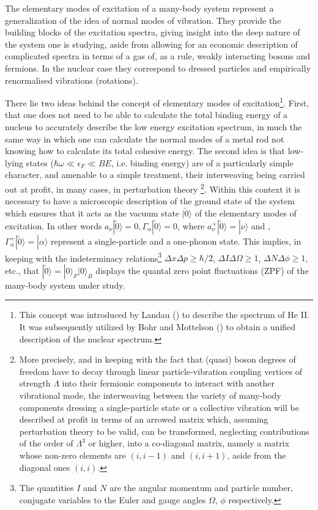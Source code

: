 The elementary modes of excitation  of a many-body system  represent a generalization of  the idea of normal modes of vibration.
They provide the building blocks of the excitation spectra, giving  insight  into the  deep nature  of the system one is studying, aside from allowing 
for an economic description  of complicated spectra in terms of a gas of, as a rule, weakly interacting bosons and fermions. In the nuclear case 
they correspond to dressed particles and empirically renormalised vibrations (rotations).

There lie two ideas behind the concept of elementary modes of excitation\footnote{This concept was introduced by Landau (\cite{Landau:41}) to describe the spectrum of He II. It was subsequently utilized by Bohr and Mottelson (\cite{Bohr:75}) to obtain a unified description of the nuclear spectrum.}. First, that one does not need to be able to calculate the total binding
energy  of a nucleus to accurately describe the low energy excitation spectrum, in much the same way in which one can calculate 
the normal modes of a metal rod not knowing how to  calculate its total cohesive energy.
The second idea is that low-lying states ($\hbar \omega \ll \epsilon_F \ll BE$, i.e. binding energy) are of a particularly simple
character, and  amenable to a simple treatment, their
interweaving  being carried out at profit, in many cases,  in perturbation theory
\footnote{More precisely, and in keeping with  the fact that (quasi)
boson degrees of freedom have to decay through linear particle-vibration 
coupling vertices of strength $\Lambda$ into their fermionic components to interact with another vibrational mode,
the interweaving between the variety of many-body components dressing a single-particle state 
or a collective vibration will be described at profit in terms of an arrowed matrix which, assuming perturbation theory
to be valid, can be transformed, neglecting contributions of the order of $\Lambda^3$ or higher, into a co-diagonal matrix, namely a matrix 
whose non-zero elements are $(i,i-1)$ and $(i,i+1)$,  aside from  the diagonal ones $(i,i)$.}. 
Within this context it is  necessary to have a microscopic description 
of the ground  state of the system  which ensures that it acts as the vacuum state 
$|\tilde0\rangle  $ of the elementary modes of excitation. In other words $a_{\nu}|\tilde 0 \rangle   = 0, \Gamma_{\alpha} |\tilde 0\rangle   =0$, where
$a^+_{\nu}|\tilde 0 \rangle   = |\nu\rangle  $ and , $\Gamma^+_{\alpha} |\tilde 0\rangle   =|\alpha\rangle  $ represent a single-particle and a one-phonon state.
This   implies, in keeping 
with the indeterminacy  relations\footnote{The quantities $I$ and $N$   are the angular momentum and particle number, conjugate variables to the Euler and gauge angles $\Omega$, $\phi$ respectively.} $\Delta x \Delta p \geq \hbar/2$, $\Delta I \Delta \Omega \geq 1$, $\Delta N \Delta \phi \geq 1$, etc.,  that $|\tilde 0\rangle   = |0\rangle  _F |0\rangle  _B$
displays the  quantal zero point fluctuations (ZPF) of the many-body system under study.


